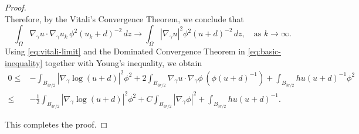 \documentclass[11pt]{article}
\newcommand{\gradgr}{\nabla_{\gamma}}
\begin{document}
\begin{proof}
\begin{equation*}
\end{equation*}
Therefore, by the Vitali's Convergence Theorem, we conclude that
\begin{equation}
\label{eq:vitali-limit}
\int_{\Omega}
\gradgr u \cdot \gradgr u_k \,
\phi^2 (u_k + d)^{-2} \, dz
\to
\int_{\Omega}
|\gradgr u|^2
\phi^2 (u + d)^{-2} \, dz,
\quad
\text{as } k \to \infty.
\end{equation}
Using \eqref{eq:vitali-limit} and the Dominated Convergence Theorem in \eqref{eq:basic-inequality} together with Young's inequality, we obtain
\begin{equation*}
\begin{aligned}
0 \le {} &
- \int_{B_{3r/2}}
\left| \gradgr \log (u + d) \right|^2
\phi^2
+ 2
\int_{B_{3r/2}}
\gradgr u \cdot \gradgr \phi \,
( \phi (u + d)^{-1}) + \int_{B_{3r/2}} h u (u +d )^{-1} \phi^2
\\
\le {} &
- \frac{1}{2}
\int_{B_{3r/2}}
\left| \gradgr \log (u + d) \right|^2
\phi^2
+ C
\int_{B_{3r/2}}
|\gradgr \phi|^2 
+ \int_{B_{3r/2}} h u (u +d )^{-1}.
\end{aligned}
\end{equation*}

This completes the proof.
\end{proof}
\end{document}
